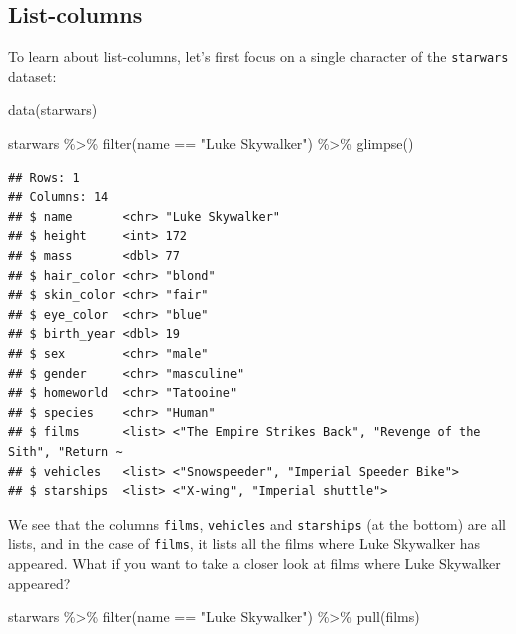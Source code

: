 \documentclass[
]{article}
\newenvironment{Shaded}{\begin{snugshade}}{\end{snugshade}}
\newcommand{\FunctionTok}[1]{\textcolor[rgb]{0.00,0.00,0.00}{#1}}
\newcommand{\NormalTok}[1]{#1}
\newcommand{\SpecialCharTok}[1]{\textcolor[rgb]{0.00,0.00,0.00}{#1}}
\newcommand{\StringTok}[1]{\textcolor[rgb]{0.31,0.60,0.02}{#1}}
\begin{document}
\hypertarget{list-columns}{%
\subsection{List-columns}\label{list-columns}}

To learn about list-columns, let's first focus on a single character of the \texttt{starwars} dataset:

\begin{Shaded}
\begin{Highlighting}[]
\FunctionTok{data}\NormalTok{(starwars)}
\end{Highlighting}
\end{Shaded}

\begin{Shaded}
\begin{Highlighting}[]
\NormalTok{starwars }\SpecialCharTok{\%\textgreater{}\%}
  \FunctionTok{filter}\NormalTok{(name }\SpecialCharTok{==} \StringTok{"Luke Skywalker"}\NormalTok{) }\SpecialCharTok{\%\textgreater{}\%}
  \FunctionTok{glimpse}\NormalTok{()}
\end{Highlighting}
\end{Shaded}

\begin{verbatim}
## Rows: 1
## Columns: 14
## $ name       <chr> "Luke Skywalker"
## $ height     <int> 172
## $ mass       <dbl> 77
## $ hair_color <chr> "blond"
## $ skin_color <chr> "fair"
## $ eye_color  <chr> "blue"
## $ birth_year <dbl> 19
## $ sex        <chr> "male"
## $ gender     <chr> "masculine"
## $ homeworld  <chr> "Tatooine"
## $ species    <chr> "Human"
## $ films      <list> <"The Empire Strikes Back", "Revenge of the Sith", "Return ~
## $ vehicles   <list> <"Snowspeeder", "Imperial Speeder Bike">
## $ starships  <list> <"X-wing", "Imperial shuttle">
\end{verbatim}

We see that the columns \texttt{films}, \texttt{vehicles} and \texttt{starships} (at the bottom) are all lists, and in
the case of \texttt{films}, it lists all the films where Luke Skywalker has appeared. What if you want to
take a closer look at films where Luke Skywalker appeared?

\begin{Shaded}
\begin{Highlighting}[]
\NormalTok{starwars }\SpecialCharTok{\%\textgreater{}\%}
  \FunctionTok{filter}\NormalTok{(name }\SpecialCharTok{==} \StringTok{"Luke Skywalker"}\NormalTok{) }\SpecialCharTok{\%\textgreater{}\%}
  \FunctionTok{pull}\NormalTok{(films)}
\end{Highlighting}
\end{Shaded}
\end{document}
